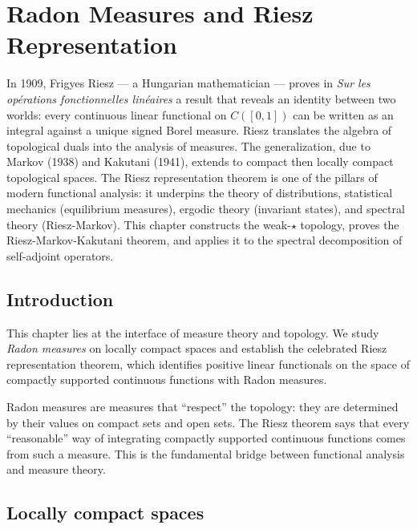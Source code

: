 \chapter{Radon Measures and Riesz Representation}
\label{ch:radon_riesz}

In 1909, Frigyes Riesz --- a Hungarian mathematician --- proves in \emph{Sur les opérations fonctionnelles linéaires} a result that reveals an identity between two worlds: every continuous linear functional on $C([0,1])$ can be written as an integral against a unique signed Borel measure. Riesz translates the algebra of topological duals into the analysis of measures. The generalization, due to Markov (1938) and Kakutani (1941), extends to compact then locally compact topological spaces. The Riesz representation theorem is one of the pillars of modern functional analysis: it underpins the theory of distributions, statistical mechanics (equilibrium measures), ergodic theory (invariant states), and spectral theory (Riesz-Markov). This chapter constructs the weak-$\star$ topology, proves the Riesz-Markov-Kakutani theorem, and applies it to the spectral decomposition of self-adjoint operators.

\section{Introduction}

This chapter lies at the interface of measure theory and topology. We study
\emph{Radon measures} on locally compact spaces and establish the
celebrated Riesz representation theorem, which
identifies positive linear functionals on the space of compactly supported continuous
functions with Radon measures.

\begin{intuition}[title=\textbf{Linking topology and measure}]
Radon measures are measures that ``respect'' the topology: they are determined by their
values on compact sets and open sets. The Riesz theorem says that every ``reasonable''
way of integrating compactly supported continuous functions comes from such a measure.
This is the fundamental bridge between functional analysis and measure theory.
\end{intuition}

\section{Locally compact spaces}

